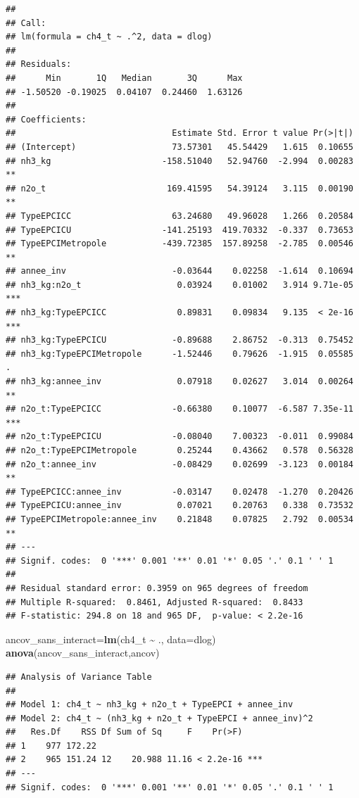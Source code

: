 \documentclass[
]{article}
\newenvironment{Shaded}{\begin{snugshade}}{\end{snugshade}}
\newcommand{\AttributeTok}[1]{\textcolor[rgb]{0.13,0.29,0.53}{#1}}
\newcommand{\FunctionTok}[1]{\textcolor[rgb]{0.13,0.29,0.53}{\textbf{#1}}}
\newcommand{\NormalTok}[1]{#1}
\newcommand{\OtherTok}[1]{\textcolor[rgb]{0.56,0.35,0.01}{#1}}
\newcommand{\SpecialCharTok}[1]{\textcolor[rgb]{0.81,0.36,0.00}{\textbf{#1}}}
\begin{document}
\begin{verbatim}
## 
## Call:
## lm(formula = ch4_t ~ .^2, data = dlog)
## 
## Residuals:
##      Min       1Q   Median       3Q      Max 
## -1.50520 -0.19025  0.04107  0.24460  1.63126 
## 
## Coefficients:
##                               Estimate Std. Error t value Pr(>|t|)    
## (Intercept)                   73.57301   45.54429   1.615  0.10655    
## nh3_kg                      -158.51040   52.94760  -2.994  0.00283 ** 
## n2o_t                        169.41595   54.39124   3.115  0.00190 ** 
## TypeEPCICC                    63.24680   49.96028   1.266  0.20584    
## TypeEPCICU                  -141.25193  419.70332  -0.337  0.73653    
## TypeEPCIMetropole           -439.72385  157.89258  -2.785  0.00546 ** 
## annee_inv                     -0.03644    0.02258  -1.614  0.10694    
## nh3_kg:n2o_t                   0.03924    0.01002   3.914 9.71e-05 ***
## nh3_kg:TypeEPCICC              0.89831    0.09834   9.135  < 2e-16 ***
## nh3_kg:TypeEPCICU             -0.89688    2.86752  -0.313  0.75452    
## nh3_kg:TypeEPCIMetropole      -1.52446    0.79626  -1.915  0.05585 .  
## nh3_kg:annee_inv               0.07918    0.02627   3.014  0.00264 ** 
## n2o_t:TypeEPCICC              -0.66380    0.10077  -6.587 7.35e-11 ***
## n2o_t:TypeEPCICU              -0.08040    7.00323  -0.011  0.99084    
## n2o_t:TypeEPCIMetropole        0.25244    0.43662   0.578  0.56328    
## n2o_t:annee_inv               -0.08429    0.02699  -3.123  0.00184 ** 
## TypeEPCICC:annee_inv          -0.03147    0.02478  -1.270  0.20426    
## TypeEPCICU:annee_inv           0.07021    0.20763   0.338  0.73532    
## TypeEPCIMetropole:annee_inv    0.21848    0.07825   2.792  0.00534 ** 
## ---
## Signif. codes:  0 '***' 0.001 '**' 0.01 '*' 0.05 '.' 0.1 ' ' 1
## 
## Residual standard error: 0.3959 on 965 degrees of freedom
## Multiple R-squared:  0.8461, Adjusted R-squared:  0.8433 
## F-statistic: 294.8 on 18 and 965 DF,  p-value: < 2.2e-16
\end{verbatim}

\begin{Shaded}
\begin{Highlighting}[]
\NormalTok{ancov\_sans\_interact}\OtherTok{=}\FunctionTok{lm}\NormalTok{(ch4\_t }\SpecialCharTok{\textasciitilde{}}\NormalTok{ ., }\AttributeTok{data=}\NormalTok{dlog)}
\FunctionTok{anova}\NormalTok{(ancov\_sans\_interact,ancov)}
\end{Highlighting}
\end{Shaded}

\begin{verbatim}
## Analysis of Variance Table
## 
## Model 1: ch4_t ~ nh3_kg + n2o_t + TypeEPCI + annee_inv
## Model 2: ch4_t ~ (nh3_kg + n2o_t + TypeEPCI + annee_inv)^2
##   Res.Df    RSS Df Sum of Sq     F    Pr(>F)    
## 1    977 172.22                                 
## 2    965 151.24 12    20.988 11.16 < 2.2e-16 ***
## ---
## Signif. codes:  0 '***' 0.001 '**' 0.01 '*' 0.05 '.' 0.1 ' ' 1
\end{verbatim}
\end{document}
